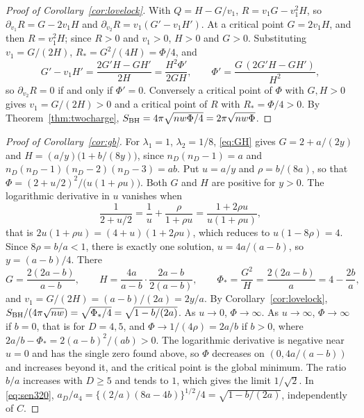\begin{proof}[Proof of Corollary~\ref{cor:lovelock}]
With $Q=H-G/v_1$, $R=v_1G-v_1^2H$, so $\partial_{v_1}R=G-2v_1H$ and $\partial_{v_2}R=v_1(G'-v_1H')$. At a critical point $G=2v_1H$, and then $R=v_1^2H$; since $R>0$ and $v_1>0$, $H>0$ and $G>0$. Substituting $v_1=G/(2H)$, $R_*=G^2/(4H)=\Phi/4$, and
\[
G'-v_1H'=\frac{2G'H-GH'}{2H}=\frac{H^2\Phi'}{2GH},\qquad\Phi'=\frac{G\,(2G'H-GH')}{H^2},
\]
so $\partial_{v_2}R=0$ if and only if $\Phi'=0$. Conversely a critical point of $\Phi$ with $G,H>0$ gives $v_1=G/(2H)>0$ and a critical point of $R$ with $R_*=\Phi/4>0$. By Theorem~\ref{thm:twocharge}, $S_{\rm BH}=4\pi\sqrt{nw\Phi/4}=2\pi\sqrt{nw\Phi}$.
\end{proof}

\begin{proof}[Proof of Corollary~\ref{cor:gb}]
For $\lambda_1=1$, $\lambda_2=1/8$, \eqref{eq:GH} gives $G=2+a/(2y)$ and $H=(a/y)\big(1+b/(8y)\big)$, since $n_D(n_D-1)=a$ and $n_D(n_D-1)(n_D-2)(n_D-3)=ab$. Put $u=a/y$ and $\rho=b/(8a)$, so that $\Phi=(2+u/2)^2/\big(u(1+\rho u)\big)$. Both $G$ and $H$ are positive for $y>0$. The logarithmic derivative in $u$ vanishes when
\[
\frac{1}{2+u/2}=\frac1u+\frac{\rho}{1+\rho u}=\frac{1+2\rho u}{u(1+\rho u)},
\]
that is $2u(1+\rho u)=(4+u)(1+2\rho u)$, which reduces to $u(1-8\rho)=4$. Since $8\rho=b/a<1$, there is exactly one solution, $u=4a/(a-b)$, so $y=(a-b)/4$. There
\[
G=\frac{2(2a-b)}{a-b},\qquad H=\frac{4a}{a-b}\cdot\frac{2a-b}{2(a-b)},\qquad \Phi_*=\frac{G^2}{H}=\frac{2(2a-b)}{a}=4-\frac{2b}{a},
\]
and $v_1=G/(2H)=(a-b)/(2a)=2y/a$. By Corollary~\ref{cor:lovelock}, $S_{\rm BH}/(4\pi\sqrt{nw})=\sqrt{\Phi_*/4}=\sqrt{1-b/(2a)}$. As $u\to0$, $\Phi\to\infty$. As $u\to\infty$, $\Phi\to\infty$ if $b=0$, that is for $D=4,5$, and $\Phi\to1/(4\rho)=2a/b$ if $b>0$, where $2a/b-\Phi_*=2(a-b)^2/(ab)>0$. The logarithmic derivative is negative near $u=0$ and has the single zero found above, so $\Phi$ decreases on $(0,4a/(a-b))$ and increases beyond it, and the critical point is the global minimum. The ratio $b/a$ increases with $D\ge5$ and tends to $1$, which gives the limit $1/\sqrt2$. In \eqref{eq:sen320}, $a_D/a_4=\big\{(2/a)(8a-4b)\big\}^{1/2}/4=\sqrt{1-b/(2a)}$, independently of $C$.
\end{proof}

